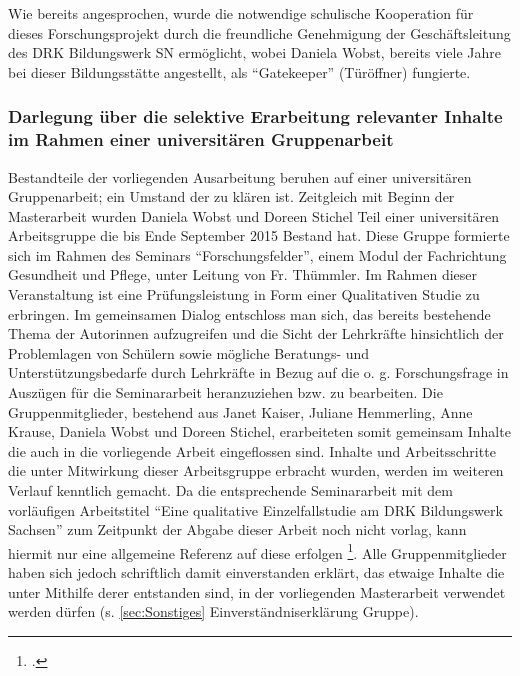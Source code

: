 Wie bereits angesprochen, wurde die notwendige schulische Kooperation für dieses Forschungsprojekt durch die freundliche Genehmigung der Geschäftsleitung des DRK Bildungswerk SN ermöglicht, wobei Daniela Wobst, bereits viele Jahre bei dieser Bildungsstätte angestellt, als "`Gatekeeper"' (Türöffner) fungierte. 

\subsubsection[Selektive Erarbeitung im Rahmen einer universitären Gruppenarbeit]{Darlegung über die selektive Erarbeitung relevanter Inhalte im Rahmen einer universitären Gruppenarbeit}
\label{sec:DarlegungÜberDieSelektiveErarbeitungRelevanterInhalteImRahmenEinerUniversitärenSeminararbeit}

Bestandteile der vorliegenden Ausarbeitung beruhen auf einer universitären Gruppenarbeit; ein Umstand der zu klären ist. Zeitgleich mit Beginn der Masterarbeit wurden Daniela Wobst und Doreen Stichel Teil einer universitären Arbeitsgruppe die bis Ende September 2015 Bestand hat. Diese Gruppe formierte sich im Rahmen des Seminars "`Forschungsfelder"', einem Modul der Fachrichtung Gesundheit und Pflege, unter Leitung von Fr. Thümmler. Im Rahmen dieser Veranstaltung ist eine Prüfungsleistung in Form einer Qualitativen Studie zu erbringen. Im gemeinsamen Dialog entschloss man sich, das bereits bestehende Thema der Autorinnen aufzugreifen und die Sicht der Lehrkräfte hinsichtlich der Problemlagen von Schülern sowie mögliche Beratungs- und Unterstützungsbedarfe durch Lehrkräfte in Bezug auf die o. g. Forschungsfrage in Auszügen für die Seminararbeit heranzuziehen bzw. zu bearbeiten. Die Gruppenmitglieder, bestehend aus Janet Kaiser, Juliane Hemmerling, Anne Krause, Daniela Wobst und Doreen Stichel, erarbeiteten somit gemeinsam Inhalte die auch in die vorliegende Arbeit eingeflossen sind. Inhalte und Arbeitsschritte die unter Mitwirkung dieser Arbeitsgruppe erbracht wurden, werden im weiteren Verlauf kenntlich gemacht. Da die entsprechende Seminararbeit mit dem vorläufigen Arbeitstitel "`Eine qualitative Einzelfallstudie am DRK Bildungswerk Sachsen"' zum Zeitpunkt der Abgabe dieser Arbeit noch nicht vorlag, kann hiermit nur eine allgemeine Referenz auf diese erfolgen \footcite{Hemmerling2015}. Alle Gruppenmitglieder haben sich jedoch schriftlich damit einverstanden erklärt, das etwaige Inhalte die unter Mithilfe derer entstanden sind, in der vorliegenden Masterarbeit verwendet werden dürfen (s. \ref{sec:Sonstiges} Einverständniserklärung Gruppe).

